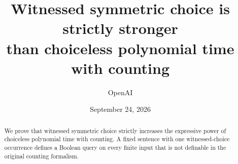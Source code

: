 \documentclass[11pt]{article}
\title{Witnessed symmetric choice is strictly stronger\\
than choiceless polynomial time with counting}
\author{OpenAI}
\date{September 24, 2026}
\theoremstyle{definition}
\theoremstyle{remark}
\numberwithin{equation}{section}
\begin{document}
\maketitle
\begin{abstract}
We prove that witnessed symmetric choice strictly increases the expressive
power of choiceless polynomial time with counting. A fixed sentence with
one witnessed-choice occurrence defines a Boolean query on every finite
input that is not definable in the original counting formalism.
\end{abstract}









\begingroup
\small


\endgroup
\end{document}
